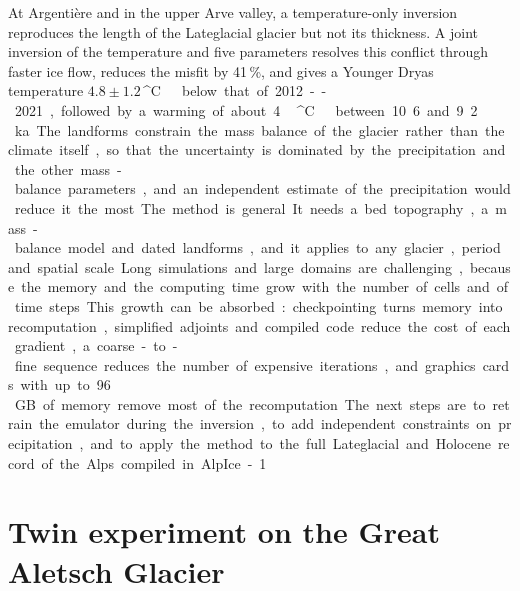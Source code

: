 \documentclass[tc, manuscript]{copernicus}
\newcommand{\degC}{\unit{^{\circ}C}}
\begin{document}
At Argenti\`ere and in the upper Arve valley, a temperature-only inversion reproduces the length of the Lateglacial glacier but not its thickness. A joint inversion of the temperature and five parameters resolves this conflict through faster ice flow, reduces the misfit by 41\,\%, and gives a Younger Dryas temperature $4.8\pm1.2$\,\degC\ below that of 2012--2021, followed by a warming of about 4\,\degC\ between 10.6 and 9.2\,ka. The landforms constrain the mass balance of the glacier rather than the climate itself, so that the uncertainty is dominated by the precipitation and the other mass-balance parameters, and an independent estimate of the precipitation would reduce it the most.

The method is general. It needs a bed topography, a mass-balance model and dated landforms, and it applies to any glacier, period and spatial scale. Long simulations and large domains are challenging, because the memory and the computing time grow with the number of cells and of time steps. This growth can be absorbed: checkpointing turns memory into recomputation, simplified adjoints and compiled code reduce the cost of each gradient, a coarse-to-fine sequence reduces the number of expensive iterations, and graphics cards with up to 96\,GB of memory remove most of the recomputation. The next steps are to retrain the emulator during the inversion, to add independent constraints on precipitation, and to apply the method to the full Lateglacial and Holocene record of the Alps compiled in AlpIce-1.



\appendix

\section{Twin experiment on the Great Aletsch Glacier}
\label{app:twin}
\end{document}
